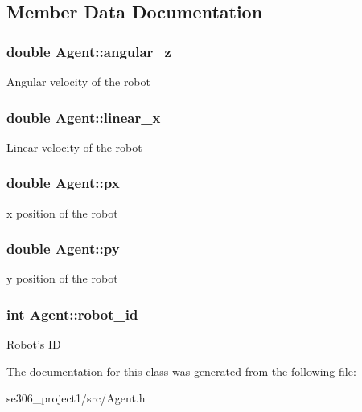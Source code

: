 \subsection{Member Data Documentation}
\hypertarget{classAgent_affc842049c5010a5f8bd99a62d650a25}{
\subsubsection[{angular\-\_\-z}]{\setlength{\rightskip}{0pt plus 5cm}double Agent\-::angular\-\_\-z\hspace{0.3cm}{\ttfamily [protected]}}}\label{classAgent_affc842049c5010a5f8bd99a62d650a25}
Angular velocity of the robot \hypertarget{classAgent_a77dfc60513d8c90b2848297e09fffba7}{
\subsubsection[{linear\-\_\-x}]{\setlength{\rightskip}{0pt plus 5cm}double Agent\-::linear\-\_\-x\hspace{0.3cm}{\ttfamily [protected]}}}\label{classAgent_a77dfc60513d8c90b2848297e09fffba7}
Linear velocity of the robot \hypertarget{classAgent_af51536ae3b511b53726b84b9226cc772}{
\subsubsection[{px}]{\setlength{\rightskip}{0pt plus 5cm}double Agent\-::px\hspace{0.3cm}{\ttfamily [protected]}}}\label{classAgent_af51536ae3b511b53726b84b9226cc772}
x position of the robot \hypertarget{classAgent_a048e8b32d02a2fd58f046a444a287015}{
\subsubsection[{py}]{\setlength{\rightskip}{0pt plus 5cm}double Agent\-::py\hspace{0.3cm}{\ttfamily [protected]}}}\label{classAgent_a048e8b32d02a2fd58f046a444a287015}
y position of the robot \hypertarget{classAgent_aefcf2085a669d7e91d932e7cc3ee88ce}{
\subsubsection[{robot\-\_\-id}]{\setlength{\rightskip}{0pt plus 5cm}int Agent\-::robot\-\_\-id\hspace{0.3cm}{\ttfamily [protected]}}}\label{classAgent_aefcf2085a669d7e91d932e7cc3ee88ce}
Robot's I\-D 

The documentation for this class was generated from the following file\-:\begin{DoxyCompactItemize}
\item 
se306\-\_\-project1/src/Agent.\-h\end{DoxyCompactItemize}
